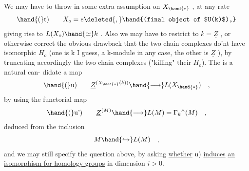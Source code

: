 We may have to throw in some extra assumption on $X_{\hand{*}}$ , at any rate
\[ \hand{(}\text{t)} \qquad X_o = e \deleted{,} \hand{(final object of $U(k)$),} \]
 giving rise to  $L(X_o)\hand{\simeq} k$ . Also we may
have to restrict to $k=\underline{Z}$ , or otherwise correct the obvious drawback that
the two chain complexes do'nt have isomorphic $H_o$ (one is k I guess,
a k-module in any case, the other is $\underline{Z}$ ), by truncating accordingly
the two chain complexes ("killing" their $H_o$). The is a natural can-%
didate  a map
\[ \hand{(}\text{u)} \qquad \underline{Z}^{(X_{\hand{*}}(k))} \hand{\longrightarrow} L(X_{\hand{*}}) \quad , \]
by using the functorial map
\[ \hand{(}\text{u')} \qquad \underline{Z}^{(M)} \hand{\longrightarrow} L(M) = \Gamma_k{}^{\wedge}(M) \quad , \]
deduced from the inclusion 
\[ M \hand{\hookrightarrow} L(M) \quad , \]
and we may still specify the question above, by asking \uline{whether} \hand{(}u) \uline{induces}
\uline{an isomorphism for homology groups} in dimension $i>0$.

